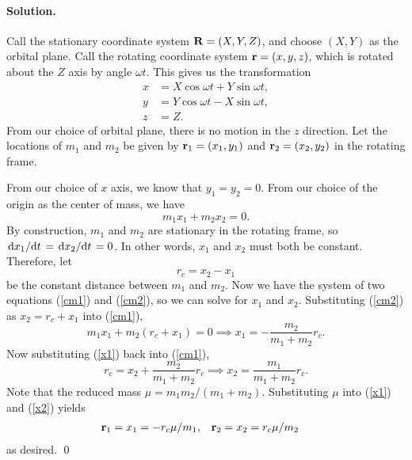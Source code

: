 \documentclass[11pt]{article}
\newcommand{\refeq}[1]{(\ref{#1})}
\newenvironment{solution}
{
    \paragraph{Solution.}
    \ignorespaces
}
{
    \bigskip
}
\begin{document}
\begin{solution}
	Call the stationary coordinate system $\mathbf{R} = (X, Y, Z)$, and choose $(X, Y)$ as the orbital plane.  Call the rotating coordinate system $\mathbf{r} = (x, y, z)$, which is rotated about the $Z$ axis by angle $\omega t$.  This gives us the transformation
	\begin{align}
		x &= X \cos{\omega t} + Y \sin{\omega t}, \label{oldx} \\
		y &= Y \cos{\omega t} - X \sin{\omega t},  \label{oldy} \\
		z &= Z.
	\end{align}
	From our choice of orbital plane, there is no motion in the $z$ direction.  Let the locations of $m_1$ and $m_2$ be given by $\mathbf{r}_1 = (x_1, y_1)$ and $\mathbf{r}_2 = (x_2, y_2)$ in the rotating frame.
	
	From our choice of $x$ axis, we know that $y_1 = y_2 = 0$.  From our choice of the origin as the center of mass, we have
	\begin{equation} \label{cm1}
		m_1 x_1 + m_2 x_2 = 0.
	\end{equation}
	By construction, $m_1$ and $m_2$ are stationary in the rotating frame, so $\dv*{x_1}{t} = \dv*{x_2}{t} = 0$.  In other words, $x_1$ and $x_2$ must both be constant.  Therefore, let
	\begin{equation} \label{cm2}
		r_c = x_2 - x_1
	\end{equation}
	be the constant distance between $m_1$ and $m_2$.  Now we have the system of two equations \refeq{cm1} and \refeq{cm2}, so we can solve for $x_1$ and $x_2$.  Substituting \refeq{cm2} as $x_2 = r_c + x_1$ into \refeq{cm1},
	\begin{equation} \label{x1}
		m_1 x_1 + m_2 (r_c + x_1) = 0 \implies x_1 = -\frac{m_2}{m_1 + m_2} r_c.
	\end{equation}
	Now substituting \refeq{x1} back into \refeq{cm1},
	\begin{equation} \label{x2}
		r_c = x_2 + \frac{m_2}{m_1 + m_2} r_c \implies x_2 = \frac{m_1}{m_1 + m_2} r_c.
	\end{equation}
	Note that the reduced mass $\mu = m_1 m_2 / (m_1 + m_2)$.  Substituting $\mu$ into \refeq{x1} and \refeq{x2} yields
	\begin{align} \label{result1a}
		\mathbf{r}_1 &= x_1 = - r_c \mu / m_1, & \mathbf{r}_2 &= x_2 = r_c \mu / m_2
	\end{align}
	as desired. \qed


\end{solution}
\end{document}
